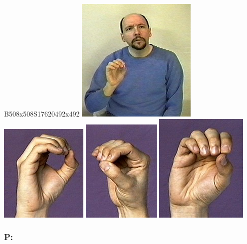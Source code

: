 \documentclass{article}
\begin{document}
B508x508S17620492x492
\includegraphics[scale=0.5]{images/o.jpg}
\includegraphics[scale=0.5]{images/o1.jpg}
\includegraphics[scale=0.5]{images/o2.jpg}
\includegraphics[scale=0.5]{images/o3.jpg}

\subsubsection{P:}
\end{document}
